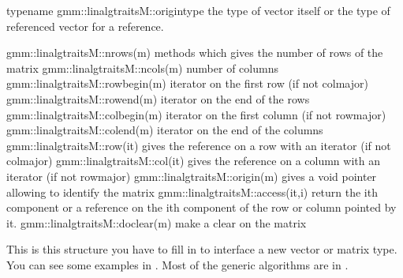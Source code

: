 \documentclass[a4paper,11pt,english]{sphinxmanual}
\begin{document}
\begin{sphinxVerbatim}[commandchars=\\\{\}]
typename gmm::linalg\PYGZus{}traits\PYGZlt{}M\PYGZgt{}::origin\PYGZus{}type    \PYGZhy{}\PYGZhy{}\PYGZgt{} the type of vector itself
                                                   or the type of referenced
                                                   vector for a reference.

gmm::linalg\PYGZus{}traits\PYGZlt{}M\PYGZgt{}::nrows(m)     \PYGZhy{}\PYGZhy{}\PYGZgt{} methods which gives the number of rows of
                                        the matrix
gmm::linalg\PYGZus{}traits\PYGZlt{}M\PYGZgt{}::ncols(m)     \PYGZhy{}\PYGZhy{}\PYGZgt{} number of columns
gmm::linalg\PYGZus{}traits\PYGZlt{}M\PYGZgt{}::row\PYGZus{}begin(m) \PYGZhy{}\PYGZhy{}\PYGZgt{} iterator on the first row (if not col\PYGZus{}major)
gmm::linalg\PYGZus{}traits\PYGZlt{}M\PYGZgt{}::row\PYGZus{}end(m)   \PYGZhy{}\PYGZhy{}\PYGZgt{} iterator on the end of the rows
gmm::linalg\PYGZus{}traits\PYGZlt{}M\PYGZgt{}::col\PYGZus{}begin(m) \PYGZhy{}\PYGZhy{}\PYGZgt{} iterator on the first column
                                        (if not row\PYGZus{}major)
gmm::linalg\PYGZus{}traits\PYGZlt{}M\PYGZgt{}::col\PYGZus{}end(m)   \PYGZhy{}\PYGZhy{}\PYGZgt{} iterator on the end of the columns
gmm::linalg\PYGZus{}traits\PYGZlt{}M\PYGZgt{}::row(it)      \PYGZhy{}\PYGZhy{}\PYGZgt{} gives the reference on a row with an iterator
                                        (if not col\PYGZus{}major)
gmm::linalg\PYGZus{}traits\PYGZlt{}M\PYGZgt{}::col(it)      \PYGZhy{}\PYGZhy{}\PYGZgt{} gives the reference on a column with an
                                        iterator  (if not row\PYGZus{}major)
gmm::linalg\PYGZus{}traits\PYGZlt{}M\PYGZgt{}::origin(m)    \PYGZhy{}\PYGZhy{}\PYGZgt{} gives a void pointer allowing to identify
                                        the matrix
gmm::linalg\PYGZus{}traits\PYGZlt{}M\PYGZgt{}::access(it,i) \PYGZhy{}\PYGZhy{}\PYGZgt{} return the ith component or a reference
                                        on the ith component of the row or
                                        column pointed by it.
gmm::linalg\PYGZus{}traits\PYGZlt{}M\PYGZgt{}::do\PYGZus{}clear(m)  \PYGZhy{}\PYGZhy{}\PYGZgt{} make a clear on the matrix
\end{sphinxVerbatim}

\sphinxAtStartPar
This is this structure you have to fill in to interface a new vector or matrix type. You can see some examples in  . Most of the generic algorithms are in  .
\end{document}
